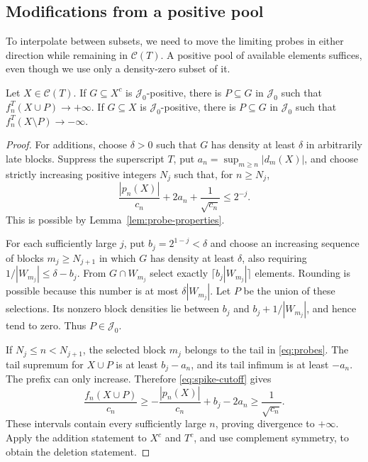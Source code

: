 \subsection{Modifications from a positive pool}

To interpolate between subsets, we need to move the limiting probes
in either direction while remaining in $\mathcal C(T)$. A positive
pool of available elements suffices, even though we use only a
density-zero subset of it.

\begin{lemma}\label{lem:positive-pool}
Let $X\in\mathcal C(T)$.
If $G\subseteq X^c$ is $\mathcal J_0$-positive, there is
$P\subseteq G$ in $\mathcal J_0$ such that
$f_n^T(X\cup P)\to+\infty$.
If $G\subseteq X$ is $\mathcal J_0$-positive, there is
$P\subseteq G$ in $\mathcal J_0$ such that
$f_n^T(X\setminus P)\to-\infty$.
\end{lemma}

\begin{proof}
For additions, choose $\delta>0$ such that $G$ has density at least
$\delta$ in arbitrarily late blocks. Suppress the superscript $T$,
put $a_n=\sup_{m\ge n}|d_m(X)|$, and choose strictly increasing
positive integers $N_j$ such that, for $n\ge N_j$,
\begin{equation}\label{eq:spike-cutoff}
 \frac{|p_n(X)|}{c_n}+2a_n+\frac1{\sqrt{c_n}}\le 2^{-j}.
\end{equation}
This is possible by Lemma~\ref{lem:probe-properties}.

For each sufficiently large $j$, put $b_j=2^{1-j}<\delta$ and choose
an increasing sequence of blocks $m_j\ge N_{j+1}$ in which $G$ has
density at least $\delta$, also requiring
$1/|W_{m_j}|\le\delta-b_j$. From $G\cap W_{m_j}$ select exactly
$\lceil b_j|W_{m_j}|\rceil$ elements. Rounding is possible because
this number is at most $\delta|W_{m_j}|$. Let $P$ be the union of these
selections. Its nonzero block densities lie between $b_j$ and
$b_j+1/|W_{m_j}|$, and hence tend to zero. Thus $P\in\mathcal J_0$.

If $N_j\le n<N_{j+1}$, the selected block $m_j$ belongs to the tail
in \eqref{eq:probes}. The tail supremum for $X\cup P$ is at least
$b_j-a_n$, and its tail infimum is at least $-a_n$. The prefix can only
increase. Therefore \eqref{eq:spike-cutoff} gives
\[
 \frac{f_n(X\cup P)}{c_n}
 \ge -\frac{|p_n(X)|}{c_n}+b_j-2a_n
 \ge \frac1{\sqrt{c_n}}.
\]
These intervals contain every sufficiently large $n$, proving
divergence to $+\infty$. Apply the addition statement to $X^c$ and
$T^c$, and use complement symmetry, to obtain the deletion statement.
\end{proof}


